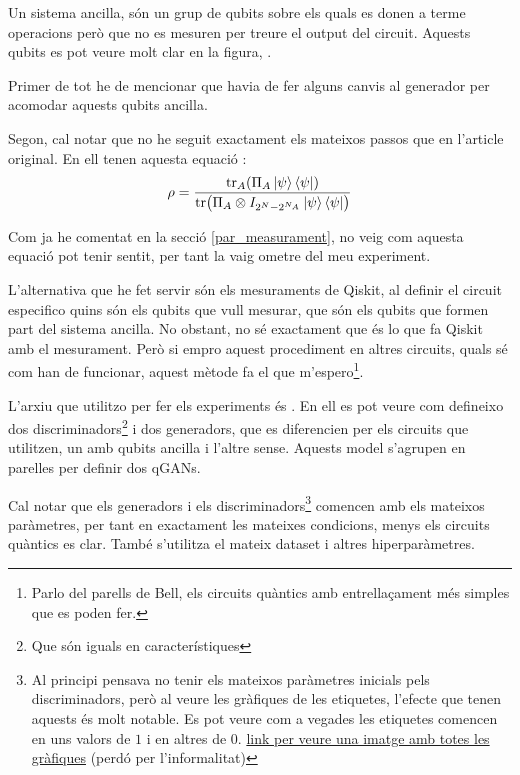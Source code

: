 Un sistema ancilla, són un grup de qubits sobre els quals es donen a terme operacions però que no es mesuren per treure el output del circuit. Aquests qubits es pot veure molt clar en la figura, . 

Primer de tot he de mencionar que havia de fer alguns canvis al generador per acomodar aquests qubits ancilla. 

Segon, cal notar que no he seguit exactament els mateixos passos que en l'article original. En ell tenen aquesta equació \cite{QGAN_exp}: 
\begin{equation*}
\rho = \frac{\tr_A(\Pi_A \ket{\psi}\bra{\psi})}{\tr(\Pi_A\otimes I_{2^N-2^{N_A}}\ket{\psi}\bra{\psi})}
\end{equation*}

Com ja he comentat en la secció \ref{par_measurament}, no veig com aquesta equació pot tenir sentit, per tant la vaig ometre del meu experiment. 

L'alternativa que he fet servir són els mesuraments de Qiskit, al definir el circuit especifico quins són els qubits que vull mesurar, que són els qubits que formen part del sistema ancilla. No obstant, no sé exactament que és lo que fa Qiskit amb el mesurament. Però si empro aquest procediment en altres circuits, quals sé com han de funcionar, aquest mètode fa el que m'espero\footnote{Parlo del parells de Bell, els circuits quàntics amb entrellaçament més simples que es poden fer.}. 

L'arxiu que utilitzo per fer els experiments és . En ell es pot veure com defineixo dos discriminadors\footnote{Que són iguals en característiques} i dos generadors, que es diferencien per els circuits que utilitzen, un amb qubits ancilla i l'altre sense. Aquests model s'agrupen en parelles per definir dos qGANs. 

Cal notar que els generadors i els discriminadors\footnote{Al principi pensava no tenir els mateixos paràmetres inicials pels discriminadors, però al veure les gràfiques de les etiquetes, l'efecte que tenen aquests és molt notable. Es pot veure com a vegades les etiquetes comencen en uns valors de $1$ i en altres de $0$. \href{https://drive.google.com/file/d/1kYZ1vmNYU17sofNluXFYnoATLfY5B0jG/view?usp=sharing}{link per veure una imatge amb totes les gràfiques} (perdó per l'informalitat)} comencen amb els mateixos paràmetres, per tant en exactament les mateixes condicions, menys els circuits quàntics es clar. També s'utilitza el mateix dataset i altres hiperparàmetres. 

